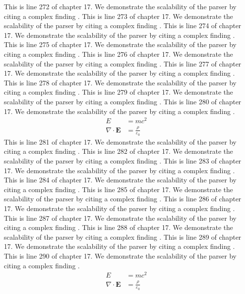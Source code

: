 This is line 272 of chapter 17. We demonstrate the scalability of the parser by citing a complex finding \cite{ref17_272}.
This is line 273 of chapter 17. We demonstrate the scalability of the parser by citing a complex finding \cite{ref17_273}.
This is line 274 of chapter 17. We demonstrate the scalability of the parser by citing a complex finding \cite{ref17_274}.
This is line 275 of chapter 17. We demonstrate the scalability of the parser by citing a complex finding \cite{ref17_275}.
This is line 276 of chapter 17. We demonstrate the scalability of the parser by citing a complex finding \cite{ref17_276}.
This is line 277 of chapter 17. We demonstrate the scalability of the parser by citing a complex finding \cite{ref17_277}.
This is line 278 of chapter 17. We demonstrate the scalability of the parser by citing a complex finding \cite{ref17_278}.
This is line 279 of chapter 17. We demonstrate the scalability of the parser by citing a complex finding \cite{ref17_279}.
This is line 280 of chapter 17. We demonstrate the scalability of the parser by citing a complex finding \cite{ref17_280}.
\begin{align*}
  E &= mc^2 \\
  \nabla \cdot \mathbf{E} &= \frac{\rho}{\varepsilon_0}
\end{align*}
This is line 281 of chapter 17. We demonstrate the scalability of the parser by citing a complex finding \cite{ref17_281}.
This is line 282 of chapter 17. We demonstrate the scalability of the parser by citing a complex finding \cite{ref17_282}.
This is line 283 of chapter 17. We demonstrate the scalability of the parser by citing a complex finding \cite{ref17_283}.
This is line 284 of chapter 17. We demonstrate the scalability of the parser by citing a complex finding \cite{ref17_284}.
This is line 285 of chapter 17. We demonstrate the scalability of the parser by citing a complex finding \cite{ref17_285}.
This is line 286 of chapter 17. We demonstrate the scalability of the parser by citing a complex finding \cite{ref17_286}.
This is line 287 of chapter 17. We demonstrate the scalability of the parser by citing a complex finding \cite{ref17_287}.
This is line 288 of chapter 17. We demonstrate the scalability of the parser by citing a complex finding \cite{ref17_288}.
This is line 289 of chapter 17. We demonstrate the scalability of the parser by citing a complex finding \cite{ref17_289}.
This is line 290 of chapter 17. We demonstrate the scalability of the parser by citing a complex finding \cite{ref17_290}.
\begin{align*}
  E &= mc^2 \\
  \nabla \cdot \mathbf{E} &= \frac{\rho}{\varepsilon_0}
\end{align*}
